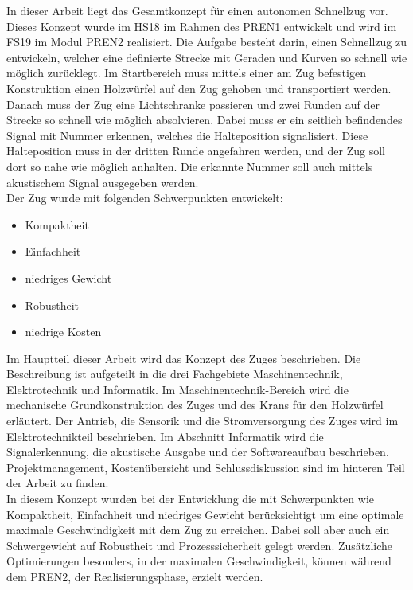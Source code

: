 \documentclass[../../main.tex]{subfiles}
\begin{document}
In dieser Arbeit liegt das Gesamtkonzept für einen autonomen Schnellzug vor. Dieses Konzept wurde im HS18 im Rahmen des PREN1 entwickelt und wird im FS19 im Modul PREN2 realisiert. Die Aufgabe besteht darin, einen Schnellzug zu entwickeln, welcher eine definierte Strecke mit Geraden und Kurven so schnell wie möglich zurücklegt. Im Startbereich muss mittels einer am Zug befestigen Konstruktion einen Holzwürfel auf den Zug gehoben und transportiert werden. Danach muss der Zug eine Lichtschranke passieren und zwei Runden auf der Strecke so schnell wie möglich absolvieren. Dabei muss er ein seitlich befindendes Signal mit Nummer erkennen, welches die Halteposition signalisiert. Diese Halteposition muss in der dritten Runde angefahren werden, und der Zug soll dort so nahe wie möglich anhalten. Die erkannte Nummer soll auch mittels akustischem Signal ausgegeben werden. \\
Der Zug wurde mit folgenden Schwerpunkten entwickelt:
\begin{itemize}
    \item Kompaktheit
    \item Einfachheit
    \item niedriges Gewicht
    \item Robustheit
    \item niedrige Kosten
\end{itemize}
Im Hauptteil dieser Arbeit wird das Konzept des Zuges beschrieben. Die Beschreibung ist aufgeteilt in die drei
Fachgebiete Maschinentechnik, Elektrotechnik und Informatik. Im Maschinentechnik-Bereich wird die mechanische
Grundkonstruktion des Zuges und des Krans für den Holzwürfel erläutert. Der Antrieb, die Sensorik und die
Stromversorgung des Zuges wird im Elektrotechnikteil beschrieben. Im Abschnitt Informatik wird die Signalerkennung, die
akustische Ausgabe und der Softwareaufbau beschrieben. Projektmanagement, Kostenübersicht und Schlussdiskussion sind im hinteren Teil der Arbeit zu finden.\\
In diesem Konzept wurden bei der Entwicklung die mit Schwerpunkten wie Kompaktheit, Einfachheit und niedriges Gewicht berücksichtigt um eine optimale maximale Geschwindigkeit mit dem Zug zu erreichen. Dabei soll aber auch ein Schwergewicht auf Robustheit und Prozesssicherheit gelegt werden. Zusätzliche Optimierungen besonders, in der maximalen Geschwindigkeit, können während dem PREN2, der Realisierungsphase, erzielt werden.
\pagebreak
\end{document}
